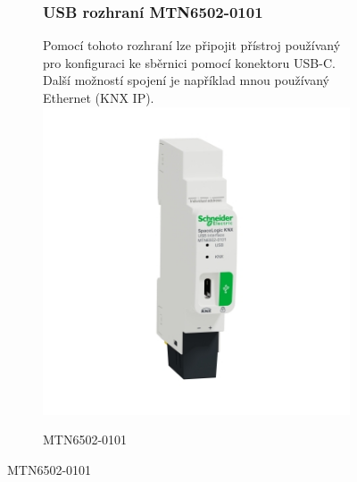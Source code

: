 \documentclass[12pt, a4paper,
twoside,        %
openright
]{report}
\begin{document}
\begin{figure}[h]
\begin{subfigure}{0.9\textwidth}
	\subsubsection{USB rozhraní  MTN6502-0101}
	Pomocí tohoto rozhraní lze připojit přístroj používaný pro konfiguraci ke sběrnici pomocí konektoru USB-C. Další možností spojení je například mnou používaný Ethernet (KNX IP).
		\centering
		\includegraphics[scale=0.2]{image/MTN6502-0101.jpg}
		\caption{MTN6502-0101}
		\label{image:7}
\end{subfigure}
\end{figure}
\end{document}
